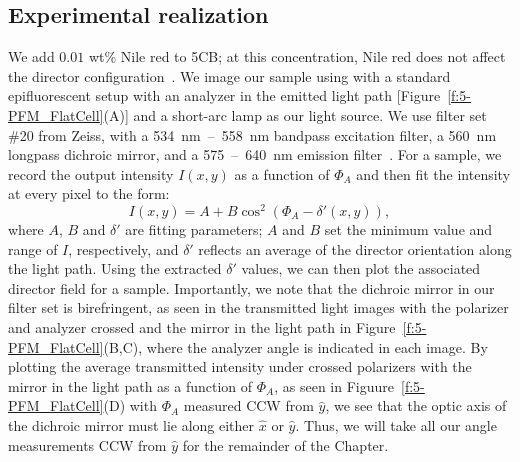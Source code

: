\subsection{Experimental realization}
We add $0.01$ wt\% Nile red to 5CB; at this concentration, Nile red does not affect the director configuration~\cite{RN173}.
We image our sample using with a standard epifluorescent setup with an analyzer in the emitted light path [Figure~\ref{f:5-PFM_FlatCell}(A)] and a short-arc lamp as our light source.
We use filter set \#20 from Zeiss, with a 534~nm~--~558~nm bandpass excitation filter, a 560~nm longpass dichroic mirror, and a 575~--~640~nm emission filter~\cite{RN288}.
For a sample, we record the output intensity $I(x,y)$ as a function of $\Phi_A$ and then fit the intensity at every pixel to the form:
\begin{equation}
    I(x,y) = A + B \cos^2{(\Phi_A-\delta'(x,y))},\label{e:5-IntFit}
\end{equation}
where $A$, $B$ and $\delta'$ are fitting parameters; $A$ and $B$ set the minimum value and range of $I$, respectively, and $\delta'$ reflects an average of the director orientation along the light path.
Using the extracted $\delta'$ values, we can then plot the associated director field for a sample.
Importantly, we note that the dichroic mirror in our filter set is birefringent, as seen in the transmitted light images with the polarizer and analyzer crossed and the mirror in the light path in Figure~\ref{f:5-PFM_FlatCell}(B,C), where the analyzer angle is indicated in each image.
By plotting the average transmitted intensity under crossed polarizers with the mirror in the light path as a function of $\Phi_A$, as seen in Figuure~\ref{f:5-PFM_FlatCell}(D) with $\Phi_A$ measured CCW from $\hat{y}$, we see that the optic axis of the dichroic mirror must lie along either $\hat{x}$ or $\hat{y}$.
Thus, we will take all our angle measurements CCW from $\hat{y}$ for the remainder of the Chapter.

